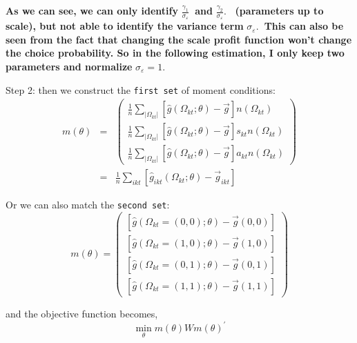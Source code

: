 \documentclass{article}
\begin{document}
\begin{enumerate}
\textbf{As we can see, we can only identify }$\frac{\gamma _{1}}{\sigma
_{\varepsilon }}$\textbf{\ and }$\frac{\gamma _{2}}{\sigma _{\varepsilon }}.$%
\textbf{\ (parameters up to scale), but not able to identify the variance
term }$\sigma _{\varepsilon }.$\textbf{\ This can also be seen from the fact
that changing the scale profit function won't change the choice probability.
So in the following estimation, I only keep two parameters and normalize }$%
\sigma _{\varepsilon }=1.$

Step 2: then we construct the \texttt{first set} of moment conditions:%
\begin{eqnarray*}
m\left( \theta \right)  &=&\left( 
\begin{array}{c}
\frac{1}{n}\sum_{\left\vert \Omega _{kt}\right\vert }\left[ \hat{g}\left(
\Omega _{kt};\theta \right) -\vec{g}\right] n\left( \Omega _{kt}\right)  \\ 
\frac{1}{n}\sum_{\left\vert \Omega _{kt}\right\vert }\left[ \hat{g}\left(
\Omega _{kt};\theta \right) -\vec{g}\right] s_{kt}n\left( \Omega
_{kt}\right)  \\ 
\frac{1}{n}\sum_{\left\vert \Omega _{kt}\right\vert }\left[ \hat{g}\left(
\Omega _{kt};\theta \right) -\vec{g}\right] a_{kt}n\left( \Omega
_{kt}\right) 
\end{array}%
\right)  \\
&=&\frac{1}{n}\sum_{ikt}\left[ \hat{g}_{ikt}\left( \Omega _{kt};\theta
\right) -\vec{g}_{ikt}\right] 
\end{eqnarray*}

Or we can also match the \texttt{second set}: 
\begin{equation*}
m\left( \theta \right) =\left( 
\begin{array}{c}
\left[ \hat{g}\left( \Omega _{kt}=\left( 0,0\right) ;\theta \right) -\vec{g}%
\left( 0,0\right) \right]  \\ 
\left[ \hat{g}\left( \Omega _{kt}=\left( 1,0\right) ;\theta \right) -\vec{g}%
\left( 1,0\right) \right]  \\ 
\left[ \hat{g}\left( \Omega _{kt}=\left( 0,1\right) ;\theta \right) -\vec{g}%
\left( 0,1\right) \right]  \\ 
\left[ \hat{g}\left( \Omega _{kt}=\left( 1,1\right) ;\theta \right) -\vec{g}%
\left( 1,1\right) \right] 
\end{array}%
\right) 
\end{equation*}

and the objective function becomes,%
\begin{equation*}
\min_{\theta }m\left( \theta \right) Wm\left( \theta \right) ^{\prime }
\end{equation*}


\end{enumerate}
\end{document}
